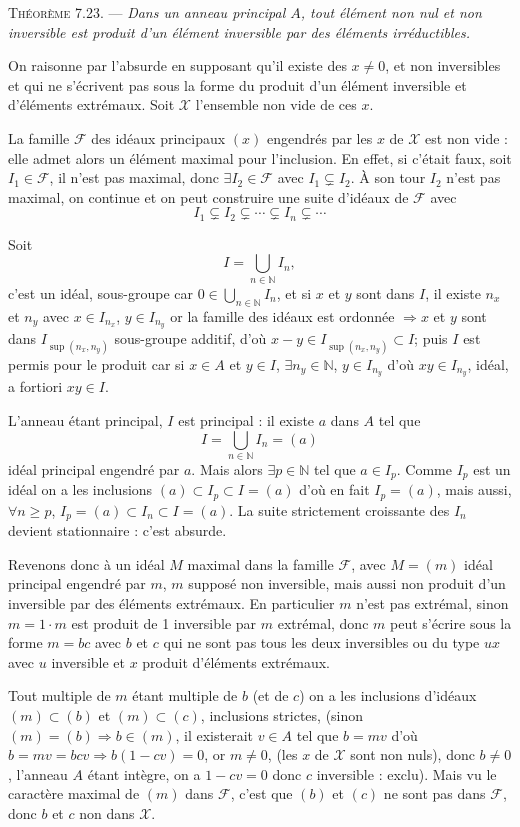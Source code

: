 \medskip\noindent\textsc{Théorème 7.23.} --- \emph{Dans un anneau principal $A$, tout élément non nul et non inversible est produit d'un élément inversible par des éléments irréductibles.}

On raisonne par l'absurde en supposant qu'il existe des $x\ne0$, et non inversibles et qui ne s'écrivent pas sous la forme du produit d'un élément inversible et d'éléments extrémaux. Soit $\mathcal X$ l'ensemble non vide de ces $x$.

La famille $\mathcal F$ des idéaux principaux $(x)$ engendrés par les $x$ de $\mathcal X$ est non vide : elle admet alors un élément maximal pour l'inclusion. En effet, si c'était faux, soit $I_1\in\mathcal F$, il n'est pas maximal, donc $\exists I_2\in\mathcal F$ avec $I_1\subsetneq I_2$. À son tour $I_2$ n'est pas maximal, on continue et on peut construire une suite d'idéaux de $\mathcal F$ avec
\[
I_1\subsetneq I_2\subsetneq\cdots\subsetneq I_n\subsetneq\cdots
\]

Soit
\[
I=\bigcup_{n\in\mathbb N}I_n,
\]
c'est un idéal, sous-groupe car $0\in\bigcup_{n\in\mathbb N}I_n$, et si $x$ et $y$ sont dans $I$, il existe $n_x$ et $n_y$ avec $x\in I_{n_x}$, $y\in I_{n_y}$ or la famille des idéaux est ordonnée $\Rightarrow x$ et $y$ sont dans $I_{\sup(n_x,n_y)}$ sous-groupe additif, d'où $x-y\in I_{\sup(n_x,n_y)}\subset I$; puis $I$ est permis pour le produit car si $x\in A$ et $y\in I$, $\exists n_y\in\mathbb N$, $y\in I_{n_y}$ d'où $xy\in I_{n_y}$, idéal, a fortiori $xy\in I$.

L'anneau étant principal, $I$ est principal : il existe $a$ dans $A$ tel que
\[
I=\bigcup_{n\in\mathbb N}I_n=(a)
\]
idéal principal engendré par $a$. Mais alors $\exists p\in\mathbb N$ tel que $a\in I_p$. Comme $I_p$ est un idéal on a les inclusions $(a)\subset I_p\subset I=(a)$ d'où en fait $I_p=(a)$, mais aussi, $\forall n\ge p$, $I_p=(a)\subset I_n\subset I=(a)$. La suite strictement croissante des $I_n$ devient stationnaire : c'est absurde.

Revenons donc à un idéal $M$ maximal dans la famille $\mathcal F$, avec $M=(m)$ idéal principal engendré par $m$, $m$ supposé non inversible, mais aussi non produit d'un inversible par des éléments extrémaux. En particulier $m$ n'est pas extrémal, sinon $m=1\cdot m$ est produit de 1 inversible par $m$ extrémal, donc $m$ peut s'écrire sous la forme $m=bc$ avec $b$ et $c$ qui ne sont pas tous les deux inversibles ou du type $ux$ avec $u$ inversible et $x$ produit d'éléments extrémaux.

Tout multiple de $m$ étant multiple de $b$ (et de $c$) on a les inclusions d'idéaux $(m)\subset(b)$ et $(m)\subset(c)$, inclusions strictes, (sinon $(m)=(b)\Rightarrow b\in(m)$, il existerait $v\in A$ tel que $b=mv$ d'où $b=mv=bcv\Rightarrow b(1-cv)=0$, or $m\ne0$, (les $x$ de $\mathcal X$ sont non nuls), donc $b\ne0$, l'anneau $A$ étant intègre, on a $1-cv=0$ donc $c$ inversible : exclu). Mais vu le caractère maximal de $(m)$ dans $\mathcal F$, c'est que $(b)$ et $(c)$ ne sont pas dans $\mathcal F$, donc $b$ et $c$ non dans $\mathcal X$.

